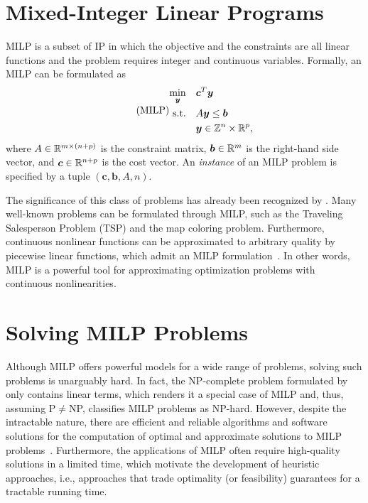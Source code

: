 \section{Mixed-Integer Linear Programs}\label{sec:milp-definition}

MILP is a subset of IP in which the objective and the constraints are all linear functions and the problem requires integer and continuous variables.
Formally, an MILP can be formulated as 
\begin{equation}\label{eq:general-milp}\tag{MILP}
\begin{split}
    \min_{\bm{y}} \quad & \bm{c}^{T}\bm{y} \\
    \textrm{s.t.} \quad & A\bm{y} \le \bm{b} \\
	  & \bm{y} \in \mathbb{Z}^{n}\times \mathbb{R}^{p} ,\end{split} \end{equation} where
	  $A\in \mathbb{R}^{m\times (n+p)}$ is the constraint matrix, $\bm{b}\in
	  \mathbb{R}^{m}$ is the right-hand side vector, and $\bm{c}\in \mathbb{R}^{n+p}$ is
	  the cost vector.  An \emph{instance} of an MILP problem is specified
	  by a tuple  $\left( \bm{c},\bm{b},A,n \right)$.

	  The significance of this class of problems has already been
	  recognized by .
	  Many well-known problems can be formulated through MILP, such as the
	  Traveling Salesperson Problem (TSP) and the map coloring problem.
	  Furthermore, continuous nonlinear functions can be approximated to
	  arbitrary quality by piecewise linear functions, which admit an MILP
	  formulation~\cite{camponogaraModelsAlgorithmsOptimal2015}.  In other
	  words, MILP is a powerful tool for approximating optimization
	  problems with continuous nonlinearities.

	  \section{Solving MILP Problems}

	  Although MILP offers powerful models for a wide range of problems,
	  solving such problems is unarguably hard.  In fact, the NP-complete
	  problem formulated by
	   only contains
	  linear terms, which renders it a special case of MILP and, thus,
	  assuming P$\neq$NP, classifies MILP problems as NP-hard.  However,
	  despite the intractable nature, there are efficient and reliable
	  algorithms and software solutions for the computation of optimal and
	  approximate solutions to MILP
	  problems~\cite{bengioMachineLearningCombinatorial2021}.  Furthermore,
	  the applications of MILP often require high-quality solutions in a
	  limited time, which motivate the development of heuristic approaches,
	  i.e., approaches that trade optimality (or feasibility) guarantees
	  for a tractable running time.

